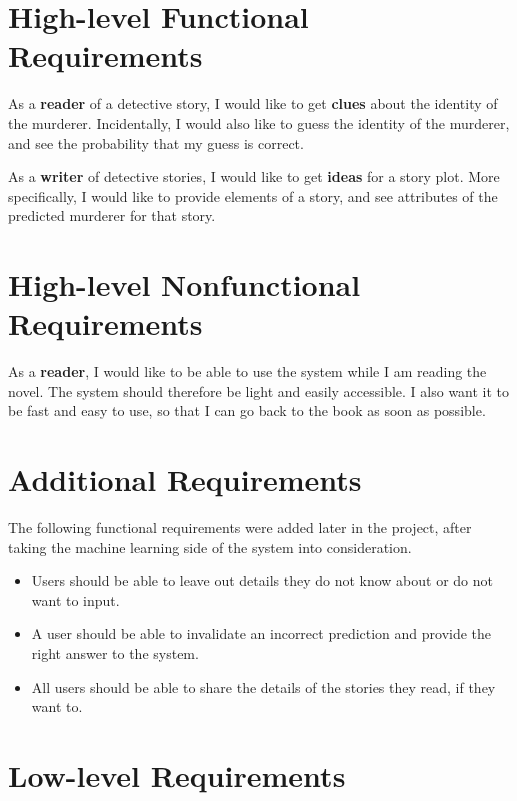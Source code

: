 \documentclass{mproj}
\begin{document}
\section{High-level Functional Requirements}
	
As a \textbf{reader} of a detective story, I would like to get \textbf{clues} about the identity of the murderer. Incidentally, I would also like to guess the identity of the murderer, and see the probability that my guess is correct. \par

As a \textbf{writer} of detective stories, I would like to get \textbf{ideas} for a story plot. More specifically, I would like to provide elements of a story, and see attributes of the predicted murderer for that story.\par

\section{High-level Nonfunctional Requirements}
	
As a \textbf{reader}, I would like to be able to use the system while I am reading the novel. The system should therefore be light and easily accessible. I also want it to be fast and easy to use, so that I can go back to the book as soon as possible. 

\section{Additional Requirements}
	
The following functional requirements were added later in the project, after taking the machine learning side of the system into consideration.
\begin{itemize}[topsep=0pt]
\item Users should be able to leave out details they do not know about or do not want to input.
\item A user should be able to invalidate an incorrect prediction and provide the right answer to the system. 
\item All users should be able to share the details of the stories they read, if they want to.
\end{itemize}

\section{Low-level Requirements}\label{requirements}
	
\end{document}
